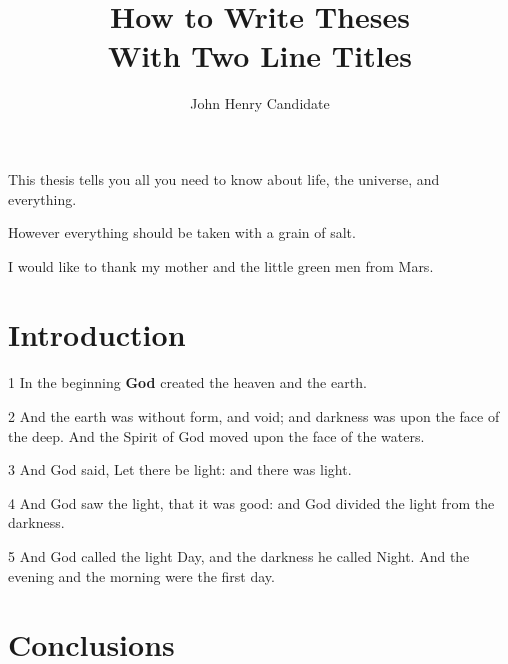 \documentclass[12pt]{report}
\title{How to Write Theses\\
            With Two Line Titles}
\author{John Henry Candidate}
\begin{document}

    \beforepreface


        This thesis tells you all you need to know about life, the
        universe, and everything.

\newpage

However everything should be taken with a grain of salt.

        I would like to thank my mother and the little green men from
        Mars. 

    \afterpreface
 
    \chapter{Introduction}
    
    1 In the beginning {\bfseries God} created the heaven and the earth.
    
    2 And the earth was without form, and void; and darkness was upon
    the face of the deep. And the Spirit of God moved upon the face of
    the waters.
    
    3 And God said, Let there be light: and there was light.
    
    4 And God saw the light, that it was good: and God divided the
    light from the darkness.
    
    5 And God called the light Day, and the darkness he called Night.
    And the evening and the morning were the first day.


    \chapter{Conclusions}
    
\end{document}
